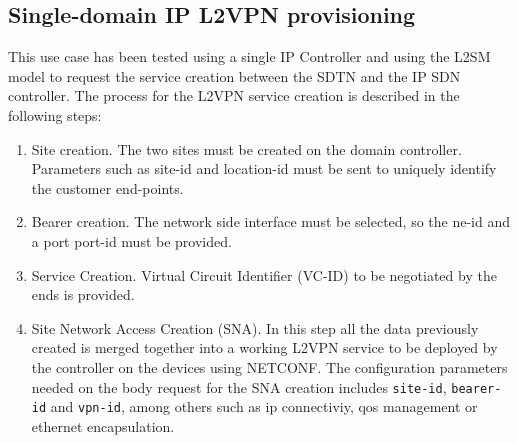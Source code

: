 \documentclass[a4paper,fleqn]{cas-dc}
\begin{document}
\subsection{Single-domain IP L2VPN provisioning}

This use case has been tested using a single IP Controller and using the L2SM model to request the service creation between the SDTN and the IP SDN controller. The process for the L2VPN service creation is described in the following steps:

\begin{enumerate}
    \item Site creation. The two sites must be created on the domain controller. Parameters such as site-id and location-id must be sent to uniquely identify the customer end-points.
    \item Bearer creation. The network side interface must be selected, so the ne-id and a port port-id must be provided.
    \item Service Creation. Virtual Circuit Identifier (VC-ID) to be negotiated by the ends is provided.  
    \item Site Network Access Creation (SNA). In this step all the data previously created is merged together into a working L2VPN service to be deployed by the controller on the devices using NETCONF. 
    The configuration parameters needed on the body request for the SNA creation includes \texttt{site-id}, \texttt{bearer-id} and \texttt{vpn-id}, among others such as ip connectiviy, qos management or ethernet encapsulation. 
\end{enumerate}
\end{document}
